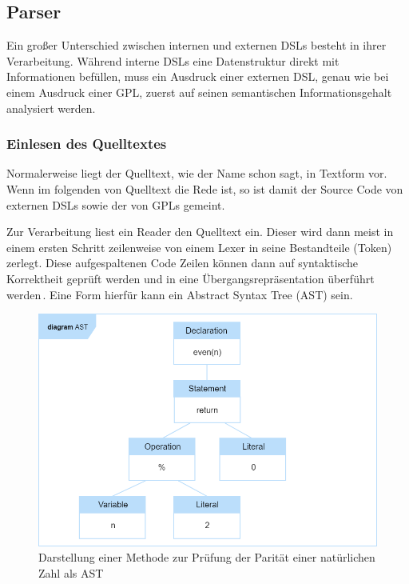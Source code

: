 \documentclass[12pt,oneside,a4paper,parskip]{scrbook}
\begin{document}
\subsection{Parser}

Ein großer Unterschied zwischen internen und externen DSLs besteht in ihrer Verarbeitung. Während interne DSLs eine Datenstruktur direkt mit Informationen befüllen, muss ein Ausdruck einer externen DSL, genau wie bei einem Ausdruck einer GPL, zuerst auf seinen semantischen Informationsgehalt analysiert werden.

\subsubsection{Einlesen des Quelltextes}

Normalerweise liegt der Quelltext, wie der Name schon sagt, in Textform vor. Wenn im folgenden von Quelltext die Rede ist, so ist damit der Source Code von externen DSLs sowie der von GPLs gemeint. 

Zur Verarbeitung liest ein Reader den Quelltext ein. Dieser wird dann meist in einem ersten Schritt zeilenweise von einem Lexer in seine Bestandteile (Token) zerlegt. Diese aufgespaltenen Code Zeilen können dann auf syntaktische Korrektheit geprüft werden und in eine Übergangsrepräsentation überführt werden\,\cite[S. 29f.]{parr2009}. Eine Form hierfür kann ein Abstract Syntax Tree (AST) sein.

\begin{figure}[htbp]
	\centering
	\includegraphics[width=1.0\textwidth]{bilder/ast}
	\caption{Darstellung einer Methode zur Prüfung der Parität einer natürlichen Zahl als AST}
	\label{fig:ast}
\end{figure}
\end{document}
